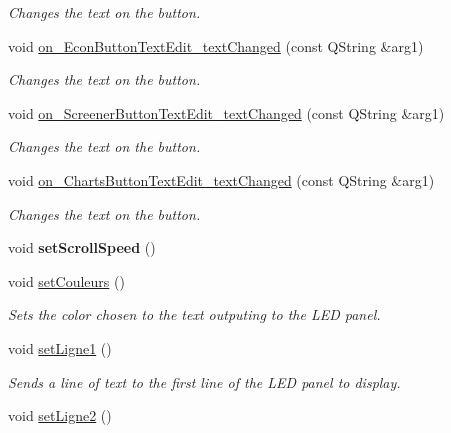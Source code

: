 \begin{DoxyCompactItemize}
\begin{DoxyCompactList}\small\item\em Changes the text on the button. \end{DoxyCompactList}\item 
void \hyperlink{class_t_k_r_t_a_p_a13c4a949a02a82b73639292611392f03}{on\+\_\+\+Econ\+Button\+Text\+Edit\+\_\+text\+Changed} (const Q\+String \&arg1)
\begin{DoxyCompactList}\small\item\em Changes the text on the button. \end{DoxyCompactList}\item 
void \hyperlink{class_t_k_r_t_a_p_a496a9cdf9ca2b12fef3201e2ccb8eac5}{on\+\_\+\+Screener\+Button\+Text\+Edit\+\_\+text\+Changed} (const Q\+String \&arg1)
\begin{DoxyCompactList}\small\item\em Changes the text on the button. \end{DoxyCompactList}\item 
void \hyperlink{class_t_k_r_t_a_p_a05b206d46bedfd8063e85f4fbc331b11}{on\+\_\+\+Charts\+Button\+Text\+Edit\+\_\+text\+Changed} (const Q\+String \&arg1)
\begin{DoxyCompactList}\small\item\em Changes the text on the button. \end{DoxyCompactList}\item 
\hypertarget{class_t_k_r_t_a_p_a9eb892a2a12c96d79d95968942811269}{void {\bfseries set\+Scroll\+Speed} ()}\label{class_t_k_r_t_a_p_a9eb892a2a12c96d79d95968942811269}

\item 
\hypertarget{class_t_k_r_t_a_p_a6ddb840aa530eb4834f137907c82309f}{void \hyperlink{class_t_k_r_t_a_p_a6ddb840aa530eb4834f137907c82309f}{set\+Couleurs} ()}\label{class_t_k_r_t_a_p_a6ddb840aa530eb4834f137907c82309f}

\begin{DoxyCompactList}\small\item\em Sets the color chosen to the text outputing to the L\+E\+D panel. \end{DoxyCompactList}\item 
\hypertarget{class_t_k_r_t_a_p_ad7900d7be69bfb772b4aa3de070dcb98}{void \hyperlink{class_t_k_r_t_a_p_ad7900d7be69bfb772b4aa3de070dcb98}{set\+Ligne1} ()}\label{class_t_k_r_t_a_p_ad7900d7be69bfb772b4aa3de070dcb98}

\begin{DoxyCompactList}\small\item\em Sends a line of text to the first line of the L\+E\+D panel to display. \end{DoxyCompactList}\item 
\hypertarget{class_t_k_r_t_a_p_a2a86e3fb126a976efa13aae2bbf3d231}{void \hyperlink{class_t_k_r_t_a_p_a2a86e3fb126a976efa13aae2bbf3d231}{set\+Ligne2} ()}\label{class_t_k_r_t_a_p_a2a86e3fb126a976efa13aae2bbf3d231}


\end{DoxyCompactItemize}
